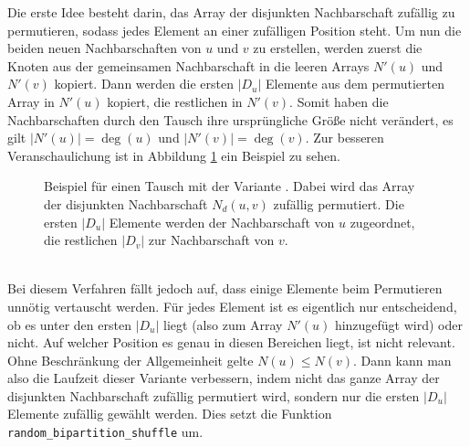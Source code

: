 Die erste Idee besteht darin,  
das Array der disjunkten Nachbarschaft zufällig zu permutieren, sodass jedes Element an 
einer zufälligen Position steht. Um nun die beiden \glqq neuen\grqq{} Nachbarschaften von $u$ und $v$ zu erstellen,
werden zuerst die Knoten aus der gemeinsamen Nachbarschaft in die leeren Arrays $N'(u)$ und $N'(v)$ kopiert.
Dann werden die ersten $|D_{u}|$ Elemente aus dem permutierten Array in $N'(u)$ kopiert, die restlichen
in $N'(v)$. Somit haben die Nachbarschaften durch den Tausch ihre 
ursprüngliche Größe nicht verändert, es gilt $|N'(u)| = \deg(u)$ und
$|N'(v)| = \deg(v)$.
Zur besseren Veranschaulichung ist in Abbildung \ref{fig:trade_shuffle} ein Beispiel zu sehen.
\begin{figure}
\centering
  \caption[Beispiel eines Tausches der disjunkten Nachbarschaft mit der Variante \perm]{Beispiel für einen Tausch mit der Variante \perm. Dabei wird das Array der 
  disjunkten Nachbarschaft $N_{d}(u,v)$ zufällig permutiert. Die ersten $|D_{u}|$ Elemente werden der Nachbarschaft
  von $u$ zugeordnet, die restlichen $|D_{v}|$ zur Nachbarschaft von $v$. }
  \label{fig:trade_shuffle}
\end{figure}
\\

Bei diesem Verfahren fällt  jedoch auf, dass einige Elemente beim Permutieren unnötig vertauscht werden.
Für jedes Element ist es eigentlich nur entscheidend, ob es unter den ersten $|D_{u}|$  liegt (also zum Array
$N'(u)$ hinzugefügt wird) oder nicht. Auf welcher Position es genau in 
diesen Bereichen liegt, ist nicht relevant. Ohne Beschränkung der Allgemeinheit gelte 
$N(u) \le N(v)$. Dann kann man
also die Laufzeit dieser Variante verbessern, indem nicht das ganze Array der disjunkten Nachbarschaft zufällig permutiert 
wird, sondern nur die ersten $|D_{u}|$ Elemente zufällig gewählt werden.
 Dies setzt die Funktion 
\texttt{random\_bipartition\_shuffle} um.
\\

